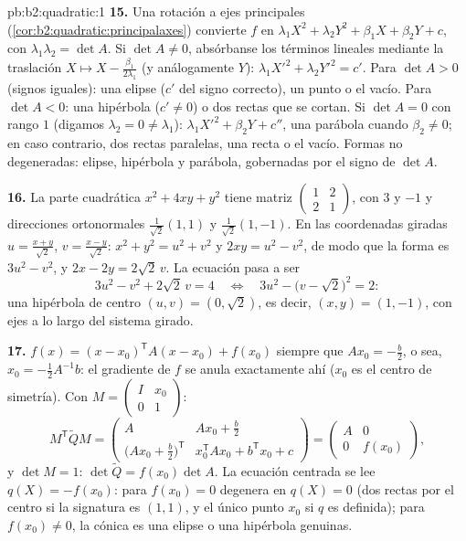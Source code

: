 \begin{solution}{pb:b2:quadratic:1}
\textbf{15.} Una rotación a ejes principales
(\cref{cor:b2:quadratic:principalaxes}) convierte $f$ en $\lambda_1X^2
+ \lambda_2Y^2 + \beta_1X + \beta_2Y + c$, con $\lambda_1\lambda_2 =
\det A$. Si $\det A \neq 0$, absórbanse los términos lineales mediante
la traslación $X \mapsto X - \frac{\beta_1}{2\lambda_1}$ (y análogamente
$Y$): $\lambda_1X'^2 + \lambda_2Y'^2 = c'$. Para $\det A > 0$ (signos
iguales): una elipse ($c'$ del signo correcto), un punto o el vacío.
Para $\det A < 0$: una hipérbola ($c' \neq 0$) o dos rectas que se
cortan. Si $\det A = 0$ con rango $1$ (digamos $\lambda_2 = 0 \neq
\lambda_1$): $\lambda_1X'^2 + \beta_2Y + c''$, una parábola cuando
$\beta_2 \neq 0$; en caso contrario, dos rectas paralelas, una recta o
el vacío. Formas no degeneradas: elipse, hipérbola y parábola,
gobernadas por el signo de $\det A$.

\textbf{16.} La parte cuadrática $x^2 + 4xy + y^2$ tiene matriz
$\begin{pmatrix}1 & 2\\ 2 & 1\end{pmatrix}$, con  $3$ y
$-1$ y direcciones ortonormales $\frac{1}{\sqrt2}(1,1)$ y
$\frac{1}{\sqrt2}(1,-1)$. En las coordenadas giradas $u =
\frac{x+y}{\sqrt2}$, $v = \frac{x-y}{\sqrt2}$: $x^2 + y^2 = u^2 + v^2$
y $2xy = u^2 - v^2$, de modo que la forma es $3u^2 - v^2$, y $2x - 2y =
2\sqrt2\,v$. La ecuación pasa a ser
\[
3u^2 - v^2 + 2\sqrt2\,v = 4
\quad\Longleftrightarrow\quad
3u^2 - \bigl(v - \sqrt2\bigr)^2 = 2 :
\]
una hipérbola de centro $(u, v) = (0, \sqrt2)$, es decir, $(x, y) = (1,
-1)$, con ejes a lo largo del sistema girado.

\textbf{17.} $f(x) = (x - x_0)^{\mathsf T}A(x - x_0) + f(x_0)$ siempre
que $Ax_0 = -\frac b2$, o sea, $x_0 = -\frac12A^{-1}b$: el gradiente de
$f$ se anula exactamente ahí ($x_0$ es el centro de simetría). Con $M =
\begin{pmatrix} I & x_0\\ 0 & 1\end{pmatrix}$:
\[
M^{\mathsf T}\widetilde QM
= \begin{pmatrix}
A & Ax_0 + \frac b2\\[2pt]
\bigl(Ax_0 + \frac b2\bigr)^{\mathsf T} &
x_0^{\mathsf T}Ax_0 + b^{\mathsf T}x_0 + c
\end{pmatrix}
= \begin{pmatrix} A & 0\\ 0 & f(x_0)\end{pmatrix},
\]
y $\det M = 1$: $\det\widetilde Q = f(x_0)\det A$. La ecuación centrada
se lee $q(X) = -f(x_0)$: para $f(x_0) = 0$ degenera en $q(X) = 0$ (dos
rectas por el centro si la signatura es $(1,1)$, y el único punto $x_0$
si $q$ es definida); para $f(x_0) \neq 0$, la cónica es una elipse o
una hipérbola genuinas.


\end{solution}
